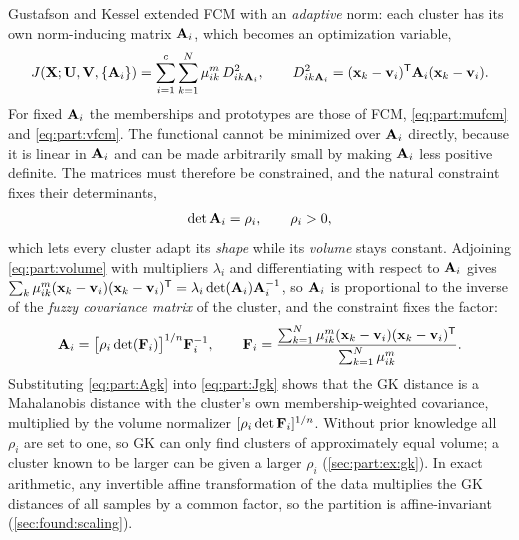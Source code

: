 Gustafson and Kessel \cite{gustafson:1979} extended FCM with an \emph{adaptive} norm: each cluster has its own norm-inducing matrix $\mathbf{A}_i$, which becomes an optimization variable,
\begin{equation}
  J(\mathbf{X};\mathbf{U},\mathbf{V},\{\mathbf{A}_i\})=\sum_{i=1}^{c}\sum_{k=1}^{N}\mu_{ik}^m\,D^2_{ik\mathbf{A}_i},\qquad D^2_{ik\mathbf{A}_i}=(\mathbf{x}_k-\mathbf{v}_i)^{\mathsf{T}}\mathbf{A}_i(\mathbf{x}_k-\mathbf{v}_i).
  \label{eq:part:Jgk}
\end{equation}
For fixed $\mathbf{A}_i$ the memberships and prototypes are those of FCM, \eqref{eq:part:mufcm} and \eqref{eq:part:vfcm}. The functional cannot be minimized over $\mathbf{A}_i$ directly, because it is linear in $\mathbf{A}_i$ and can be made arbitrarily small by making $\mathbf{A}_i$ less positive definite. The matrices must therefore be constrained, and the natural constraint fixes their determinants,
\begin{equation}
  \det\mathbf{A}_i=\rho_i,\qquad \rho_i>0,
  \label{eq:part:volume}
\end{equation}
which lets every cluster adapt its \emph{shape} while its \emph{volume} stays constant. Adjoining \eqref{eq:part:volume} with multipliers $\lambda_i$ and differentiating with respect to $\mathbf{A}_i$ gives $\sum_k\mu_{ik}^m(\mathbf{x}_k-\mathbf{v}_i)(\mathbf{x}_k-\mathbf{v}_i)^{\mathsf{T}}=\lambda_i\det(\mathbf{A}_i)\mathbf{A}_i^{-1}$, so $\mathbf{A}_i$ is proportional to the inverse of the \emph{fuzzy covariance matrix} of the cluster, and the constraint fixes the factor:
\begin{equation}
  \mathbf{A}_i=\bigl[\rho_i\det(\mathbf{F}_i)\bigr]^{1/n}\mathbf{F}_i^{-1},\qquad
  \mathbf{F}_i=\frac{\sum_{k=1}^{N}\mu_{ik}^m(\mathbf{x}_k-\mathbf{v}_i)(\mathbf{x}_k-\mathbf{v}_i)^{\mathsf{T}}}{\sum_{k=1}^{N}\mu_{ik}^m}.
  \label{eq:part:Agk}
\end{equation}
Substituting \eqref{eq:part:Agk} into \eqref{eq:part:Jgk} shows that the GK distance is a Mahalanobis distance with the cluster's own membership-weighted covariance, multiplied by the volume normalizer $[\rho_i\det\mathbf{F}_i]^{1/n}$. Without prior knowledge all $\rho_i$ are set to one, so GK can only find clusters of approximately equal volume; a cluster known to be larger can be given a larger $\rho_i$ (\cref{sec:part:ex:gk}). In exact arithmetic, any invertible affine transformation of the data multiplies the GK distances of all samples by a common factor, so the partition is affine-invariant (\cref{sec:found:scaling}).

